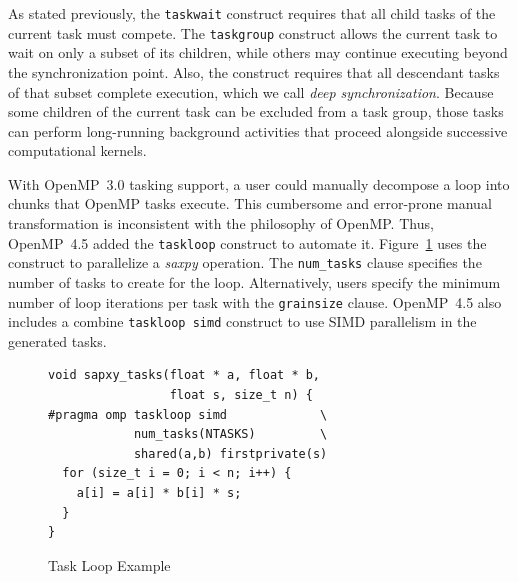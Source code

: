 As stated previously, the \texttt{taskwait} construct requires that all child 
tasks of the current task must compete. The \texttt{taskgroup} construct 
allows the current task to wait on only a subset of its children, while others 
may continue executing beyond the synchronization point. Also, the construct
requires that all descendant tasks of that subset complete execution, which
we call \emph{deep synchronization}. Because some children of the current 
task can be excluded from a task group, those tasks can perform long-running 
background activities that proceed alongside successive computational kernels.

\label{sec:Taskloop}
With OpenMP~3.0 tasking support, a user could manually decompose a loop into 
chunks that OpenMP tasks execute. This cumbersome and error-prone manual 
transformation is inconsistent with the philosophy of OpenMP. Thus, OpenMP~4.5
added the \texttt{taskloop} construct to automate it. 
Figure~\ref{fig:TaskloopExample} uses the construct to parallelize a 
\emph{saxpy} operation. The \texttt{num\_tasks} clause specifies the number of 
tasks to create for the loop. Alternatively, users specify the minimum number 
of loop iterations per task with the \texttt{grainsize} clause. OpenMP~4.5
also includes a combine \texttt{taskloop simd} construct to use SIMD 
parallelism in the generated tasks.

\begin{figure}
\begin{verbatim}
void sapxy_tasks(float * a, float * b,
                 float s, size_t n) {
#pragma omp taskloop simd             \
            num_tasks(NTASKS)         \
            shared(a,b) firstprivate(s)
  for (size_t i = 0; i < n; i++) {
    a[i] = a[i] * b[i] * s;
  }
}
\end{verbatim}
\caption{Task Loop Example\label{fig:TaskloopExample}}
\end{figure}
